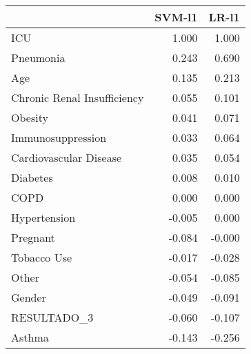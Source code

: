 \begin{tabular}{lrr}
\toprule
{} &  SVM-l1 &  LR-l1 \\
\midrule
ICU                         &   1.000 &  1.000 \\
Pneumonia                   &   0.243 &  0.690 \\
Age                         &   0.135 &  0.213 \\
Chronic Renal Insufficiency &   0.055 &  0.101 \\
Obesity                     &   0.041 &  0.071 \\
Immunosuppression           &   0.033 &  0.064 \\
Cardiovascular Disease      &   0.035 &  0.054 \\
Diabetes                    &   0.008 &  0.010 \\
COPD                        &   0.000 &  0.000 \\
Hypertension                &  -0.005 &  0.000 \\
Pregnant                    &  -0.084 & -0.000 \\
Tobacco Use                 &  -0.017 & -0.028 \\
Other                       &  -0.054 & -0.085 \\
Gender                      &  -0.049 & -0.091 \\
RESULTADO\_3                 &  -0.060 & -0.107 \\
Asthma                      &  -0.143 & -0.256 \\
\bottomrule
\end{tabular}
